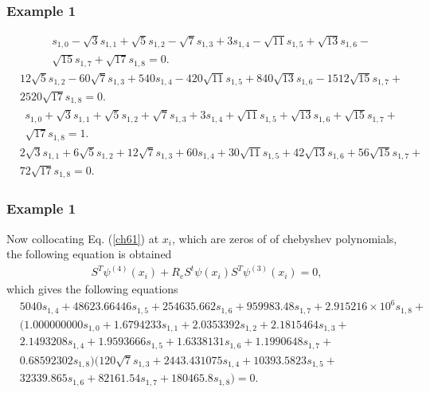 \documentclass{beamer}
\begin{document}
\begin{frame}\frametitle{Example 1}
	\justifying
	\tiny
\begin{eqnarray}\label{ch62a}
&s_{1,0}-\sqrt{3}s_{1,1}+\sqrt{5}s_{1,2}-\sqrt{7}s_{1,3}+3s_{1,4}-\sqrt{11}s_{1,5}+\sqrt{13}s_{1,6}-\nonumber\\
&\sqrt{15}s_{1,7}+\sqrt{17}s_{1,8}=0.
\end{eqnarray}
\tiny
\begin{eqnarray}\label{ch62b}
&12\sqrt{5}s_{1,2}-60\sqrt{7}s_{1,3}+540s_{1,4}-420\sqrt{11}s_{1,5}+840\sqrt{13}s_{1,6}-1512\sqrt{15}s_{1,7}+\nonumber\\
&2520\sqrt{17}s_{1,8}=0.
\end{eqnarray}
\tiny
\begin{eqnarray}\label{ch62c}
&s_{1,0}+\sqrt{3}s_{1,1}+\sqrt{5}s_{1,2}+\sqrt{7}s_{1,3}+3s_{1,4}+\sqrt{11}s_{1,5}+\sqrt{13}s_{1,6}+\sqrt{15}s_{1,7}+\nonumber\\
&\sqrt{17}s_{1,8}=1.
\end{eqnarray}
\tiny
\begin{eqnarray}\label{ch62d}
&2\sqrt{3}s_{1,1}+6\sqrt{5}s_{1,2}+12\sqrt{7}s_{1,3}+60s_{1,4}+30\sqrt{11}s_{1,5}+42\sqrt{13}s_{1,6}+56\sqrt{15}s_{1,7}+\nonumber\\
&72\sqrt{17}s_{1,8}=0.
\end{eqnarray}		
\end{frame}
\begin{frame}\frametitle{Example 1}
\justifying
Now collocating Eq. (\ref{ch61}) at $x_{i}$, which are zeros of of chebyshev polynomials, the following equation is obtained
\begin{eqnarray}\label{ch63}
S^{T}\psi^{(4)}(x_{i})+R_{e}S^{t}\psi(x_{i})S^{T}\psi^{(3)}(x_{i})=0\nonumber,
\end{eqnarray}
which gives the following equations
\tiny
\begin{equation}\label{ch63aa}
\begin{aligned}
&5040s_{1,4}+48623.66446s_{1,5}+254635.662s_{1,6}+959983.48s_{1,7}+2.915216\times10^{6}s_{1,8}+\\
&(1.000000000s_{1,0}+1.6794233s_{1,1}+2.0353392s_{1,2}+2.1815464s_{1,3}+\\
&2.1493208s_{1,4}+1.9593666s_{1,5}+1.6338131s_{1,6}+1.1990648s_{1,7}+\\
&0.68592302s_{1,8}) (120 \sqrt{7}s_{1,3}+2443.431075s_{1,4}+10393.5823s_{1,5}+ \\
&32339.865s_{1,6}+82161.54s_{1,7}+180465.8s_{1,8})=0.
\end{aligned}
\end{equation}
\end{frame}
\end{document}
